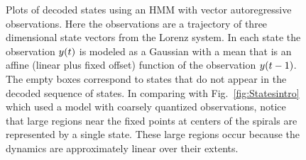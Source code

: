 \begin{figure}[p]
  \caption[Vector autoregressive observation models.]%
  {Plots of decoded states using an HMM with vector autoregressive
    observations.  Here the observations are a trajectory of three
    dimensional state vectors from the Lorenz system.  In each state
    the observation ${y}{(t)}$ is modeled as a Gaussian with a mean
    that is an affine (linear plus fixed offset) function of the
    observation ${y}{(t-1)}$.  The empty boxes correspond to states
    that do not appear in the decoded sequence of states.  In
    comparing with Fig.~\ref{fig:Statesintro} which used a model with
    coarsely quantized observations, notice that large regions near
    the fixed points at centers of the spirals are represented by a
    single state.  These large regions occur because the dynamics are
    approximately linear over their extents.}
  \label{fig:VARGstates}
\end{figure}


